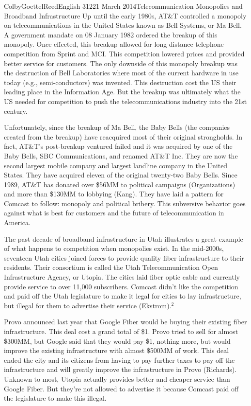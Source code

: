 \documentclass[12pt]{article}
\begin{document}
\begin{mla}{Colby}{Goettel}{Reed}{English 312}{21 March 2014}{Telecommunication Monopolies and Broadband Infrastructure}
Up until the early 1980s, AT\&T controlled a monopoly on telecommunications in the United States known as Bell Systems, or Ma Bell. A government mandate on 08 January 1982 ordered the breakup of this monopoly. Once effected, this breakup allowed for long-distance telephone competition from Sprint and MCI. This competition lowered prices and provided better service for customers. The only downside of this monopoly breakup was the destruction of Bell Laboratories where most of the current hardware in use today (e.g., semi-conductors) was invented. This destruction cost the US their leading place in the Information Age. But the breakup was ultimately what the US needed for competition to push the telecommunications industry into the 21st century.

Unfortunately, since the breakup of Ma Bell, the Baby Bells (the companies created from the breakup) have reacquired most of their original strongholds. In fact, AT\&T's post-breakup ventured failed and it was acquired by one of the Baby Bells, SBC Communications, and renamed AT\&T Inc. They are now the second largest mobile company and largest landline company in the United States. They have acquired eleven of the original twenty-two Baby Bells. Since 1989, AT\&T has donated over \$56MM to political campaigns (Organizations) and more than \$130MM to lobbying (Kang). They have laid a pattern for Comcast to follow: monopoly and political bribery. This subversive behavior goes against what is best for customers and the future of telecommunication in America.

The past decade of broadband infrastructure in Utah illustrates a great example of what happens to competition when monopolies exist. In the mid-2000s, seventeen Utah cities joined forces to provide quality fiber infrastructure to their residents. Their consortium is called the Utah Telecommunication Open Infrastructure Agency, or Utopia. The cities laid fiber optic cable and currently provide service to over 11,000 subscribers. Comcast didn't like the competition and paid off the Utah legislature to make it legal for cities to lay infrastructure, but illegal for them to advertise their service (Ekstrom).$^2$

Provo announced last year that Google Fiber would be buying their existing fiber infrastructure. This deal cost a grand total of \$1. Provo tried to sell for almost \$300MM, but Google said that they would pay \$1, nothing more, but would improve the existing infrastructure with almost \$500MM of work. This deal ended the city and its citizens from having to pay further taxes to pay off the infrastructure and will greatly improve the infrastructure in Provo (Richards). Unknown to most, Utopia actually provides better and cheaper service than Google Fiber. But they're not allowed to advertise it because Comcast paid off the legislature to make this illegal.


\end{mla}
\end{document}

